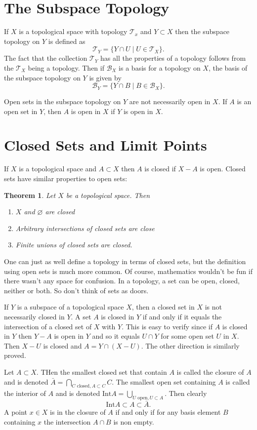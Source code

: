 \documentclass{article}
\newcommand{\Ba}{\mathcal{B}}
\newcommand{\Ta}{\mathcal{T}}
\newtheorem{theorem}{Theorem}[section]
\theoremstyle{remark}
\begin{document}
\section{The Subspace Topology}
If $X$ is a topological space with topology $\Ta_x$ and $Y\subset X$ then the subspace topology on $Y$ is defined as
$$
    \Ta_Y=\{Y\cap U\mid U\in\Ta_X\}.
$$
The fact that the collection $\Ta_Y$ has all the properties of a topology follows from the $\Ta_X$ being a topology.
Then if $\Ba_X$ is a basis for a topology on $X$, the basis of the subspace topology on $Y$ is given by
$$
    \Ba_Y=\{Y\cap B\mid B\in\Ba_X\}.
$$

Open sets in the subspace topology on $Y$ are not necessarily open in $X$.
If $A$ is an open set in $Y$, then $A$ is open in $X$ if $Y$ is open in $X$.

\section{Closed Sets and Limit Points}
If $X$ is a topological space and $A\subset X$ then $A$ is closed if $X-A$ is open.
Closed sets have similar properties to open sets:
\begin{theorem}
    Let $X$ be a topological space. Then
    \begin{enumerate}
        \item $X$ and $\varnothing$ are closed
        \item Arbitrary intersections of closed sets are close
        \item Finite unions of closed sets are closed.
    \end{enumerate}
\end{theorem}
One can just as well define a topology in terms of closed sets, but the definition using open sets is much more common.
Of course, mathematics wouldn't be fun if there wasn't any space for confusion. In a topology, a set can be open, closed, neither or both. 
So don't think of sets as doors. 

If $Y$ is a subspace of a topological space $X$, then a closed set in $X$ is not necessarily closed in $Y$.
A set $A$ is closed in $Y$ if and only if it equals the intersection of a closed set of $X$ with $Y$. 
This is easy to verify since if $A$ is closed in $Y$ then $Y-A$ is open in $Y$ and so it equals $U\cap Y$ for some open set $U$ in $X$. 
Then $X-U$ is closed and $A=Y\cap(X-U)$. The other direction is similarly proved.

Let $A\subset X$. THen the smallest closed set that contain $A$ is called the closure of $A$ and is denoted $\bar{A}=\bigcap_{C\text{ closed}, A\subset C} C$.
The smallest open set containing $A$ is called the interior of $A$ and is denoted $\text{Int} A = \bigcup_{U\text{ open}, U\subset A}$. Then clearly
$$
    \text{Int}A\subset A\subset\bar{A}.
$$
A point $x\in X$ is in the closure of $A$ if and only if for any basis element $B$ containing $x$ the intersection $A\cap B$ is non empty.
\end{document}
